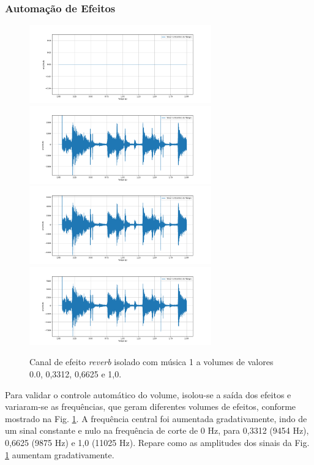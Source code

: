 \subsubsection*{Automação de Efeitos}

\begin{figure}[h]
    \centering
    \includegraphics[width=0.7\textwidth]{figuras/fig66.png}
    \includegraphics[width=0.7\textwidth]{figuras/fig67.png}
    \includegraphics[width=0.7\textwidth]{figuras/fig68.png}
    \includegraphics[width=0.7\textwidth]{figuras/fig69.png}
    \caption{Canal de efeito \textit{reverb} isolado com música 1 a volumes de valores 0.0, 0,3312, 0,6625 e 1,0.}
    \label{fig66}
\end{figure}

Para validar o controle automático do volume, isolou-se a saída dos efeitos e variaram-se as frequências, que geram diferentes volumes de efeitos, %
conforme mostrado na Fig. \ref{fig66}.
A frequência central foi aumentada gradativamente, indo de um sinal constante e nulo na frequência de corte de 0 Hz, para 0,3312 (9454 Hz), 0,6625 (9875 Hz) e 1,0 (11025 Hz). Repare como as amplitudes dos sinais da Fig. \ref{fig66} aumentam gradativamente.

